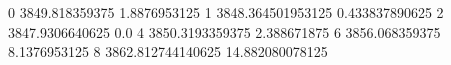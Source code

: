 0 3849.818359375 1.8876953125
1 3848.364501953125 0.433837890625
2 3847.9306640625 0.0
4 3850.3193359375 2.388671875
6 3856.068359375 8.1376953125
8 3862.812744140625 14.882080078125
